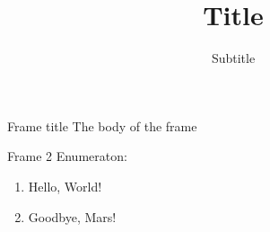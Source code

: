 \documentclass{beamer}
\title{Title}
\subtitle{Subtitle}
\begin{document}
\begin{frame}
\titlepage
\end{frame}

\begin{frame}{Frame title}
\indent The body of the frame
\end{frame}

\begin{frame}{Frame 2}
Enumeraton:
\pause
\begin{enumerate}
\item Hello, World!
\pause
\item Goodbye, Mars!
\end{enumerate}
\end{frame}
\end{document}
